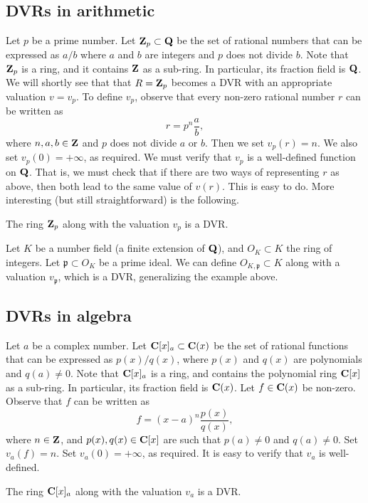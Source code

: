 \documentclass[12pt]{article}
\begin{document}
\subsection{DVRs in arithmetic}
Let $p$ be a prime number.
Let ${\bf Z}_p \subset {\bf Q}$ be the set of rational numbers that can be expressed as $a / b$ where $a$ and $b$ are integers and $p$ does not divide $b$.
Note that ${\bf Z}_p$ is a ring, and it contains ${\bf Z}$ as a sub-ring.
In particular, its fraction field is ${\bf Q}$.
We will shortly see that that $R = {\bf Z}_p$ becomes a DVR with an appropriate valuation $v = v_p$.
To define $v_p$, observe that every non-zero rational number $r$ can be written as
\[ r = p^n \frac{a}{b},\]
where $n, a, b \in {\bf Z}$ and $p$ does not divide $a$ or $b$.
Then we set $v_p(r) = n$.
We also set $v_p(0) = +\infty$, as required.
We must verify that $v_p$ is a well-defined function on ${\bf Q}$.
That is, we must check that if there are two ways of representing $r$ as above, then both lead to the same value of $v(r)$.
This is easy to do.
More interesting (but still straightforward) is the following.
\begin{proposition}
  The ring ${\bf Z}_p$ along with the valuation $v_p$ is a DVR.
\end{proposition}

\begin{remark}
  Let $K$ be a number field (a finite extension of ${\bf Q}$), and $O_K \subset K$ the ring of integers.
  Let $\mathfrak p \subset O_K$ be a prime ideal.
  We can define $O_{K, \mathfrak p} \subset K$ along with a valuation $v_{\mathfrak p}$, which is a DVR, generalizing the example above. 
\end{remark}

\subsection{DVRs in algebra}
Let $a$ be a complex number.
Let ${\bf C}[x]_a \subset {\bf C}(x)$ be the set of rational functions
that can be expressed as $p(x)/q(x)$, where $p(x)$ and $q(x)$ are polynomials and $q(a) \neq 0$.
Note that ${\bf C}[x]_a$ is a ring, and contains the polynomial ring ${\bf C}[x]$ as a sub-ring.
In particular, its fraction field is ${\bf C}(x)$.
Let $f \in {\bf C}(x)$ be non-zero.
Observe that $f$ can be written as
\[ f = (x-a)^n \frac{p(x)}{q(x)},\]
where $n \in {\bf Z}$, and $p(x), q(x) \in {\bf C}[x]$ are such that $p(a) \neq 0$ and $q(a) \neq 0$.
Set $v_a(f) = n$.
Set $v_a(0) = +\infty$, as required.
It is easy to verify that $v_a$ is well-defined.
\begin{proposition}
  The ring ${\bf C}[x]_a$ along with the valuation $v_a$ is a DVR.
\end{proposition}
\end{document}
